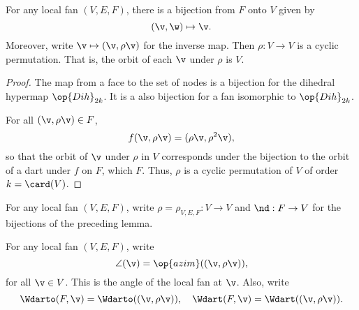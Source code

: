 \begin{lemma}[]%
For any local fan $(V,E,F)$, there is a bijection from $F$ onto $V$
given by
\[ 
(\v,\w) \mapsto \v.
\] 
Moreover, write $\v\mapsto(\v,\rho\v)$ for the inverse map. 
Then $\rho:V\to V$ is a cyclic permutation.  That is, the orbit
of each $\v$ under $\rho$ is $V$.
\end{lemma}
%




\begin{proof} The map from a face to the set of nodes is a bijection
  for the dihedral hypermap $\op{Dih}_{2k}$. It is a also bijection
  for a fan isomorphic to $\op{Dih}_{2k}$.

For all $(\v,\rho \v)\in F$,
\[ 
f(\v,\rho \v) = (\rho\v,\rho^2\v),
\] 
so that the orbit of $\v$ under $\rho$ in $V$ corresponds under the
bijection to the orbit of a dart under $f$ on $F$, which $F$.  Thus,
$\rho$ is a cyclic permutation of $V$ of order $k=\card(V)$.
\end{proof}

\begin{definition}[$\rho$,~$\nd$] 
For any  local fan $(V,E,F)$, write $\rho=\rho_{V,E,F}:V\to V$
and $\nd:F\to V$  for the bijections of the preceding
lemma.
\end{definition}
%
%


\begin{definition}
For any  local fan $(V,E,F)$,
write
\[ 
\angle(\v) = \op{azim}((\v,\rho\v)),
\] 
for all $\v\in V$.  This is the  angle of the
 local fan at $\v$.  Also, write
\[ 
  \Wdarto(F,\v) = \Wdarto((\v,\rho \v)),\quad 
\Wdart(F,\v) =\Wdart((\v,\rho \v)).
\] 
%
%
\end{definition}

